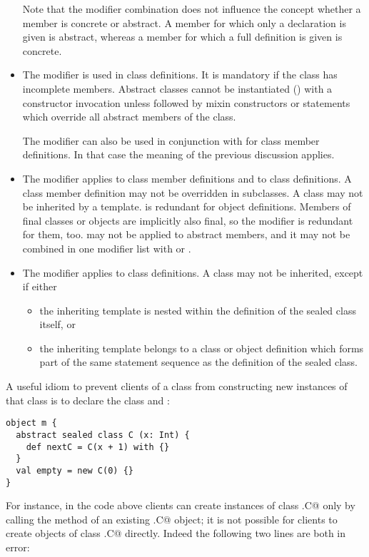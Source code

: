 \documentclass[a4paper,12pt,twoside,titlepage]{book}
\begin{document}
\begin{itemize}
Note that the  modifier combination does not
influence the concept whether a member is concrete or
abstract. A member for which only a declaration is given is abstract,
whereas a member for which a full definition is given is concrete.

\item
The  modifier is used in class definitions. It is
mandatory if the class has incomplete members.  Abstract classes
cannot be instantiated () with a constructor
invocation unless followed by mixin constructors or statements which
override all abstract members of the class.

The  modifier can also be used in conjunction with
 for class member definitions. In that case the meaning
of the previous discussion applies.
\item
The  modifier applies to class member definitions and to
class definitions. A  class member definition may not be
overridden in subclasses. A  class may not be inherited by
a template.  is redundant for object definitions.  Members
of final classes or objects are implicitly also final, so the
 modifier is redundant for them, too.   may
not be applied to abstract members, and it may not be combined in one
modifier list with  or .
\item
The  modifier applies to class definitions. A
 class may not be inherited, except if either
\begin{itemize}
\item
the inheriting template is nested within the definition of the sealed
class itself, or
\item
the inheriting template belongs to a class or object definition which
forms part of the same statement sequence as the definition of the
sealed class.
\end{itemize}
\end{itemize}

\example A useful idiom to prevent clients of a class from
constructing new instances of that class is to declare the class
 and :

\begin{lstlisting}
object m {
  abstract sealed class C (x: Int) {
    def nextC = C(x + 1) with {}
  }
  val empty = new C(0) {}
}
\end{lstlisting}
For instance, in the code above clients can create instances of class
\lstinline@m.C@ only by calling the  method of an existing \lstinline@m.C@
object; it is not possible for clients to create objects of class
\lstinline@m.C@ directly. Indeed the following two lines are both in error:
\end{document}

